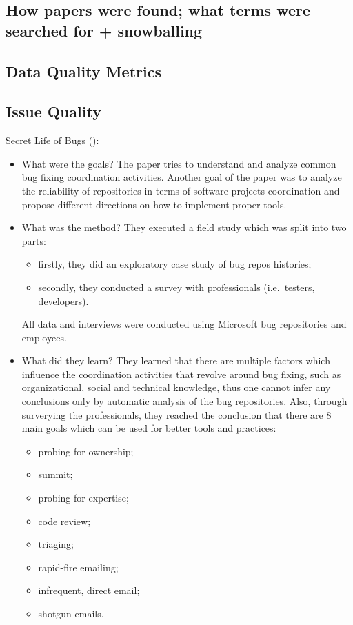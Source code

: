 \documentclass{mprop}
\begin{document}
\subsection{How papers were found; what terms were searched for + snowballing}

\subsection{Data Quality Metrics}

\subsection{Issue Quality}

Secret Life of Bugs (\citep{aranda2009secret}):
\begin{itemize}
\item What were the goals?
  The paper tries to understand and analyze common bug fixing coordination
  activities. Another goal of the paper was to analyze the reliability of
  repositories in terms of software projects coordination and propose
  different directions on how to implement proper tools.
\item What was the method?
  They executed a field study which was split into two parts:
  \begin{itemize}
  \item firstly, they did an exploratory case study of bug repos histories;
  \item secondly, they conducted a survey with professionals (i.e.\ testers,
    developers).
  \end{itemize}
  All data and interviews were conducted using Microsoft bug repositories and
  employees.
\item What did they learn?
  They learned that there are multiple factors which influence the coordination
  activities that revolve around bug fixing, such as organizational, social and
  technical knowledge, thus one cannot infer any conclusions only by automatic
  analysis of the bug repositories. Also, through surverying the professionals,
  they reached the conclusion that there are 8 main goals which can be used for
  better tools and practices:
  \begin{itemize}
  \item probing for ownership;
  \item summit;
  \item probing for expertise;
  \item code review;
  \item triaging;
  \item rapid-fire emailing;
  \item infrequent, direct email;
  \item shotgun emails.
  \end{itemize}


\end{itemize}
\end{document}
